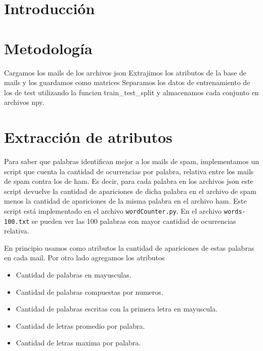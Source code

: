 \documentclass[10pt, a4paper]{article}
\begin{document}
\fecha{\today}



\maketitle
\tableofcontents
\newpage

\section*{Introducción}

\section{Metodología}
Cargamos los mails de los archivos json
Extrajimos los atributos de la base de mails y los guardamos como matrices
Separamos los datos de entrenamiento de los de test utilizando la funciøn train\_test\_split y almacenamos cada conjunto en archivos npy.

\section{Extracción de atributos}
Para saber que palabras identifican mejor a los mails de spam, implementamos un script que cuenta la cantidad de ocurrencias por palabra, relativa entre los mails de spam contra los de ham.
Es decir, para cada palabra en los archivos json este script devuelve la cantidad de apariciones de dicha palabra en el archivo de spam menos la cantidad de apariciones de la misma palabra en el archivo ham.
Este script está implementado en el archivo \texttt{wordCounter.py}. En el archivo \texttt{words-100.txt} se pueden ver las 100 palabras con mayor cantidad de ocurrencias relativa.

En principio usamos como atributos la cantidad de apariciones de estas palabras en cada mail. Por otro lado agregamos los atributos

\begin{itemize}
\item Cantidad de palabras en mayusculas.
\item Cantidad de palabras compuestas por numeros.
\item Cantidad de palabras escritas con la primera letra en mayuscula.
\item Cantidad de letras promedio por palabra. 
\item Cantidad de letras maxima por palabra. 
\end{itemize}
\end{document}
